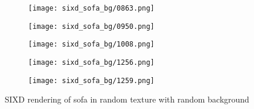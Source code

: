 \begin{figure}[h!]
\begin{subfigure}[b]{0.32\linewidth}
  \end{subfigure}
  \begin{subfigure}[b]{0.32\linewidth}
    \texttt{[image: sixd\_sofa\_bg/0863.png]}
  \end{subfigure}
  \begin{subfigure}[b]{0.32\linewidth}
    \texttt{[image: sixd\_sofa\_bg/0950.png]}
  \end{subfigure}
  \begin{subfigure}[b]{0.32\linewidth}
    \texttt{[image: sixd\_sofa\_bg/1008.png]}
  \end{subfigure}
  \begin{subfigure}[b]{0.32\linewidth}
    \texttt{[image: sixd\_sofa\_bg/1256.png]}
  \end{subfigure}
  \begin{subfigure}[b]{0.32\linewidth}
    \texttt{[image: sixd\_sofa\_bg/1259.png]}
  \end{subfigure}
  \caption{SIXD rendering of sofa in random texture with random background}
  \label{fig:sixd_sofa_bg}
\end{figure}



